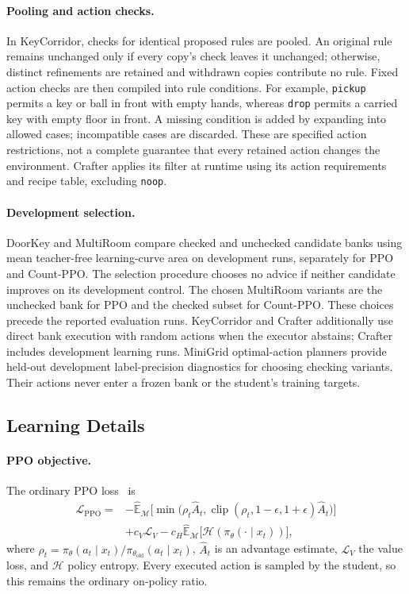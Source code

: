 \paragraph{Pooling and action checks.}
In KeyCorridor, checks for identical proposed rules are pooled. An
original rule remains unchanged only if every copy's check leaves it
unchanged; otherwise, distinct refinements are retained and withdrawn
copies contribute no rule.
Fixed action checks are then compiled into rule conditions. For
example, \texttt{pickup} permits a key or ball in front with empty
hands, whereas \texttt{drop} permits a carried key with empty floor
in front. A missing condition is added by expanding into allowed
cases; incompatible cases are discarded. These are specified action
restrictions, not a complete guarantee that every retained action
changes the environment. Crafter applies its filter at runtime using
its action requirements and recipe table, excluding \texttt{noop}.

\paragraph{Development selection.}
DoorKey and MultiRoom compare checked and unchecked candidate banks
using mean teacher-free learning-curve area on development runs,
separately for PPO and Count-PPO. The selection procedure chooses
no advice if neither candidate improves on its development control.
The chosen MultiRoom variants are the unchecked bank for PPO and
the checked subset for Count-PPO. These choices precede the reported
evaluation runs. KeyCorridor and Crafter additionally use direct bank
execution with random actions when the executor abstains; Crafter
includes development learning runs. MiniGrid optimal-action planners
provide held-out development label-precision diagnostics for choosing
checking variants. Their actions never enter a frozen bank or the
student's training targets.

\subsection{Learning Details}
\label{app:learning_details}

\paragraph{PPO objective.}
The ordinary PPO loss~\citep{schulman2017ppo} is
\begin{align}
\mathcal{L}_{\mathrm{PPO}}={}&-\hat{\mathbb{E}}_{\mathcal{M}}
\bigl[\min\bigl(\rho_t\hat{A}_t,
\operatorname{clip}(\rho_t,1-\epsilon,1+\epsilon)\hat{A}_t\bigr)\bigr]
\nonumber\\
&+c_V\mathcal{L}_V-c_H\hat{\mathbb{E}}_{\mathcal{M}}
\bigl[\mathcal{H}(\pi_\theta(\cdot\mid x_t))\bigr],
\label{eq:ppo}
\end{align}
where $\rho_t=\pi_\theta(a_t\mid x_t)/
\pi_{\theta_{\mathrm{old}}}(a_t\mid x_t)$,
$\hat{A}_t$ is an advantage estimate, $\mathcal{L}_V$ the value loss,
and $\mathcal{H}$ policy entropy. Every executed action is sampled
by the student, so this remains the ordinary on-policy ratio.

